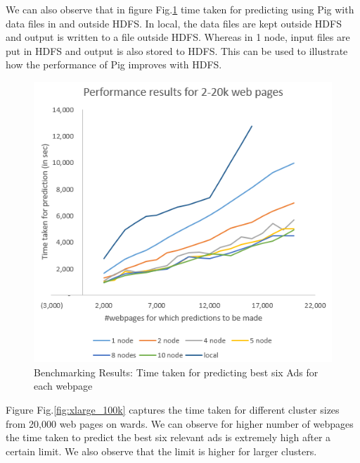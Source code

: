 \documentclass[9pt,twocolumn,twoside]{../../styles/osajnl}
\begin{document}
We can also observe that in figure Fig.\ref{fig:xlarge_20k} time taken for predicting using Pig with data files in and outside HDFS. In local, the data files are kept outside HDFS and output is written to a file outside HDFS. Whereas in 1 node, input files are put in HDFS and output is also stored to HDFS. This can be used to illustrate how the performance of Pig improves with HDFS.

\begin{figure}[hptb]
\centering
\includegraphics[width=\linewidth]{images/xlarge_20k.PNG}
\caption{ Benchmarking Results: Time taken for predicting best six Ads for each webpage}
\label{fig:xlarge_20k}
\end{figure}

Figure Fig.\ref{fig:xlarge_100k} captures the time taken for different cluster sizes from 20,000 web pages on wards. We can observe for higher number of webpages the time taken to predict the best six relevant ads is extremely high after a certain limit. We also observe that the limit is higher for larger clusters.
\end{document}
